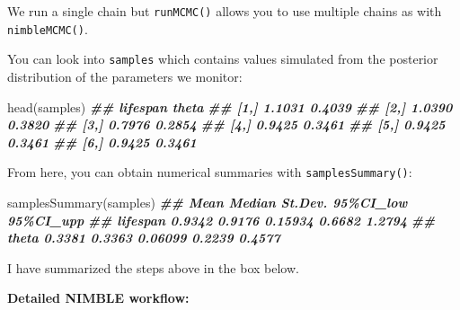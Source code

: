 \documentclass[
  12pt,
]{krantz}
\newenvironment{Shaded}{\begin{snugshade}}{\end{snugshade}}
\newcommand{\DocumentationTok}[1]{\textcolor[rgb]{0.56,0.35,0.01}{\textbf{\textit{#1}}}}
\newcommand{\FunctionTok}[1]{\textcolor[rgb]{0.00,0.00,0.00}{#1}}
\newcommand{\NormalTok}[1]{#1}
\begin{document}
We run a single chain but \texttt{runMCMC()} allows you to use multiple chains as with \texttt{nimbleMCMC()}.

You can look into \texttt{samples} which contains values simulated from the posterior distribution of the parameters we monitor:

\begin{Shaded}
\begin{Highlighting}[]
\FunctionTok{head}\NormalTok{(samples)}
\DocumentationTok{\#\#      lifespan  theta}
\DocumentationTok{\#\# [1,]   1.1031 0.4039}
\DocumentationTok{\#\# [2,]   1.0390 0.3820}
\DocumentationTok{\#\# [3,]   0.7976 0.2854}
\DocumentationTok{\#\# [4,]   0.9425 0.3461}
\DocumentationTok{\#\# [5,]   0.9425 0.3461}
\DocumentationTok{\#\# [6,]   0.9425 0.3461}
\end{Highlighting}
\end{Shaded}

From here, you can obtain numerical summaries with \texttt{samplesSummary()}:

\begin{Shaded}
\begin{Highlighting}[]
\FunctionTok{samplesSummary}\NormalTok{(samples)}
\DocumentationTok{\#\#            Mean Median St.Dev. 95\%CI\_low 95\%CI\_upp}
\DocumentationTok{\#\# lifespan 0.9342 0.9176 0.15934    0.6682    1.2794}
\DocumentationTok{\#\# theta    0.3381 0.3363 0.06099    0.2239    0.4577}
\end{Highlighting}
\end{Shaded}

I have summarized the steps above in the box below.

\textbf{Detailed NIMBLE workflow:}
\end{document}
